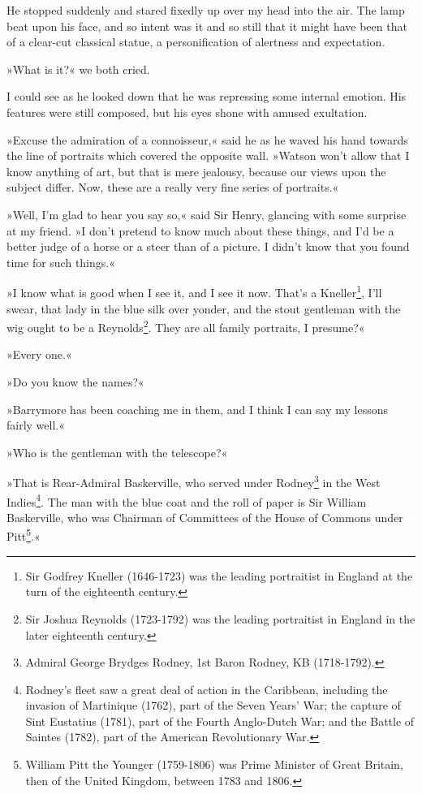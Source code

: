 He stopped suddenly and stared fixedly up over my head into the air. The lamp beat upon his face, and so intent was it and so still that it might have been that of a clear-cut classical statue, a personification of alertness and expectation.

»What is it?« we both cried.

I could see as he looked down that he was repressing some internal emotion. His features were still composed, but his eyes shone with amused exultation.

»Excuse the admiration of a connoisseur,« said he as he waved his hand towards the line of portraits which covered the opposite wall. »Watson won't allow that I know anything of art, but that is mere jealousy, because our views upon the subject differ. Now, these are a really very fine series of portraits.«

»Well, I'm glad to hear you say so,« said Sir Henry, glancing with some surprise at my friend. »I don't pretend to know much about these things, and I'd be a better judge of a horse or a steer than of a picture. I didn't know that you found time for such things.«

»I know what is good when I see it, and I see it now. That's a Kneller\footnote{Sir Godfrey Kneller (1646-1723) was the leading portraitist in England at the turn of the eighteenth century.}, I'll swear, that lady in the blue silk over yonder, and the stout gentleman with the wig ought to be a Reynolds\footnote{Sir Joshua Reynolds (1723-1792) was the leading portraitist in England in the later eighteenth century.}. They are all family portraits, I presume?«

»Every one.«

»Do you know the names?«

»Barrymore has been coaching me in them, and I think I can say my lessons fairly well.«

»Who is the gentleman with the telescope?«

»That is Rear-Admiral Baskerville, who served under Rodney\footnote{Admiral George Brydges Rodney, 1st Baron Rodney, KB (1718-1792).} in the West Indies\footnote{Rodney's fleet saw a great deal of action in the Caribbean, including the invasion of Martinique (1762), part of the Seven Years' War; the capture of Sint Eustatius (1781), part of the Fourth Anglo-Dutch War; and the Battle of Saintes (1782), part of the American Revolutionary War.}. The man with the blue coat and the roll of paper is Sir William Baskerville, who was Chairman of Committees of the House of Commons under Pitt\footnote{William Pitt the Younger (1759-1806) was Prime Minister of Great Britain, then of the United Kingdom, between 1783 and 1806.}.«


